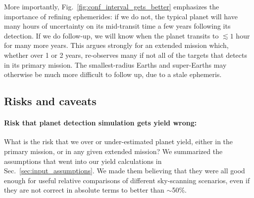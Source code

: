 More importantly, Fig.~\ref{fig:conf_interval_gets_better} emphasizes the importance of refining \tesss ephemerides: if we do not, the typical \tess planet will have many hours of uncertainty on its mid-transit time a few years following its detection.
If we do follow-up, we will know when the planet transits to $\lesssim1$ hour for many more years.
This argues strongly for an extended mission which, whether over 1 or 2 years, re-observes many if not all of the targets that \tess detects in its primary mission. 
The smallest-radius Earths and super-Earths may otherwise be much more difficult
to follow up, due to a stale ephemeris.


\subsection{Risks and caveats}
\label{sec:risks_caveats}
\paragraph{Risk that planet detection simulation gets yield wrong:}
What is the risk that we over or under-estimated \tesss planet yield, either in the primary mission, or in any given extended mission?
We summarized the assumptions that went into our yield calculations in Sec.~\ref{sec:input_assumptions}.
We made them believing that they were all good enough for useful relative comparisons of different sky-scanning scenarios,
even if they are not correct in absolute terms to better than $\sim$50\%.

